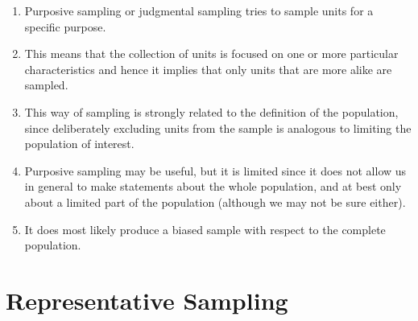 \begin{enumerate}
    \item Purposive sampling or judgmental sampling tries to sample units for a specific purpose. 
    \hfill \cite{statistics/book/Statistics-for-Data-Scientists/Maurits-Kaptein}
    
    \item This means that the collection of units is focused on one or more particular characteristics and hence it implies that only units that are more alike are sampled.
    \hfill \cite{statistics/book/Statistics-for-Data-Scientists/Maurits-Kaptein}

    \item This way of sampling is strongly related to the definition of the population, since deliberately excluding units from the sample is analogous to limiting the population of interest.
    \hfill \cite{statistics/book/Statistics-for-Data-Scientists/Maurits-Kaptein}

    \item Purposive sampling may be useful, but it is limited since it does not allow us in general to make statements about the whole population, and at best only about a limited part of the population (although we may not be sure either).
    \hfill \cite{statistics/book/Statistics-for-Data-Scientists/Maurits-Kaptein}

    \item It does most likely produce a biased sample with respect to the complete population.
    \hfill \cite{statistics/book/Statistics-for-Data-Scientists/Maurits-Kaptein}
\end{enumerate}













\section{Representative Sampling \cite{statistics/book/Statistics-for-Data-Scientists/Maurits-Kaptein}}\label{Sampling Plans/Representative Sampling}

